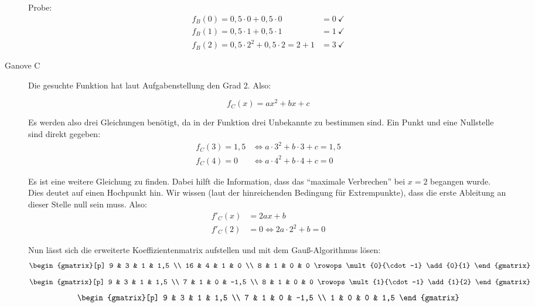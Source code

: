 \documentclass[11pt, a4paper,
]{scrartcl}
\begin{document}
\begin{aufgabe}
\begin{loesung}
\begin{description}
				Probe:
				\begin{align*}
				f_B(0) = 0,5\cdot 0 + 0,5\cdot 0 &= 0 \ \checkmark \\
				f_B(1) = 0,5\cdot 1 + 0,5\cdot 1 &= 1 \ \checkmark \\
				f_B(2) = 0,5\cdot 2^2 + 0,5\cdot 2 = 2 + 1 &= 3 \ \checkmark
				\end{align*}
				
				\item[Ganove C]
				Die gesuchte Funktion hat laut Aufgabenstellung den Grad 2. Also:
				
				\[ f_C(x) = ax^2 + bx + c \]
				
				Es werden also drei Gleichungen benötigt, da in der Funktion drei Unbekannte zu bestimmen sind. Ein Punkt und eine Nullstelle sind direkt gegeben:
				\begin{align*}
					f_C(3) = 1,5 &\Leftrightarrow a\cdot 3^2 + b\cdot 3 + c = 1,5 \\
					f_C(4) = 0 &\Leftrightarrow a\cdot 4^2 + b\cdot 4 + c = 0
				\end{align*}
				
				Es ist eine weitere Gleichung zu finden. Dabei hilft die Information, dass das \enquote{maximale Verbrechen} bei $x=2$ begangen wurde. Dies deutet auf einen Hochpunkt hin. Wir wissen (laut der hinreichenden Bedingung für Extrempunkte), dass die erste Ableitung an dieser Stelle null sein muss. Also:
				\begin{align*}
					f'_C(x) &= 2ax + b \\
					f'_C(2) &= 0 \Leftrightarrow 2a\cdot 2^2 + b = 0
				\end{align*}
				
				Nun lässt sich die erweiterte Koeffizientenmatrix aufstellen und mit dem Gauß-Algorithmus lösen:
				\[ \begin{gmatrix}[p]
				9 & 3 & 1 & 1,5 \\ 
				16 & 4 & 1 & 0 \\
				8 & 1 & 0 & 0
				\rowops
				\mult{0}{\cdot -1}
				\add{0}{1}
				\end{gmatrix} \]
				\[ \begin{gmatrix}[p]
				9 & 3 & 1 & 1,5 \\ 
				7 & 1 & 0 & -1,5 \\
				8 & 1 & 0 & 0
				\rowops
				\mult{1}{\cdot -1}
				\add{1}{2}
				\end{gmatrix} \]
				\[ \begin{gmatrix}[p]
				9 & 3 & 1 & 1,5 \\ 
				7 & 1 & 0 & -1,5 \\
				1 & 0 & 0 & 1,5
				\end{gmatrix} \]
				

\end{description}
\end{loesung}
\end{aufgabe}
\end{document}
